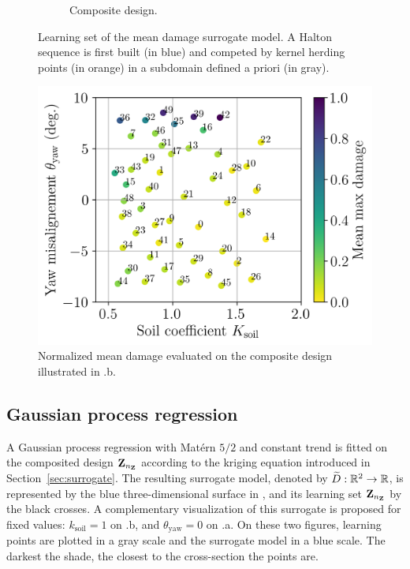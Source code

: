 \begin{figure}
\begin{subfigure}{0.48\linewidth}
        \caption{Composite design.}
    \end{subfigure}
    \caption{Learning set of the mean damage surrogate model. A Halton sequence is first built (in blue) and competed by kernel herding points (in orange) in a subdomain defined a priori (in gray).}
    \label{fig:initial_doe}
\end{figure}

\begin{figure}[h!]
    \centering
    \includegraphics[width=0.6\linewidth]{./part3/figures/OWT/normalized_results_mean.png}
    \caption{Normalized mean damage evaluated on the composite design illustrated in .b.}
    \label{fig:evaluated_doe}
\end{figure}


\subsection{Gaussian process regression}

A Gaussian process regression with Matérn $5/2$ and constant trend is fitted on the composited design ${\bf Z}_{n_{\bf Z}}$ according to the kriging equation introduced in Section~\ref{sec:surrogate}. 
The resulting surrogate model, denoted by $\widetilde{D}:\mathbb{R}^2 \rightarrow \mathbb{R}$, is represented by the blue three-dimensional surface in , and its learning set  ${\bf Z}_{n_{\bf Z}}$ by the black crosses.  
A complementary visualization of this surrogate is proposed for fixed values: $k_{\mathrm{soil}}=1$ on .b, and $\theta_{\mathrm{yaw}}=0$ on .a. 
On these two figures, learning points are plotted in a gray scale and the surrogate model in a blue scale. 
The darkest the shade, the closest to the cross-section the points are. 

